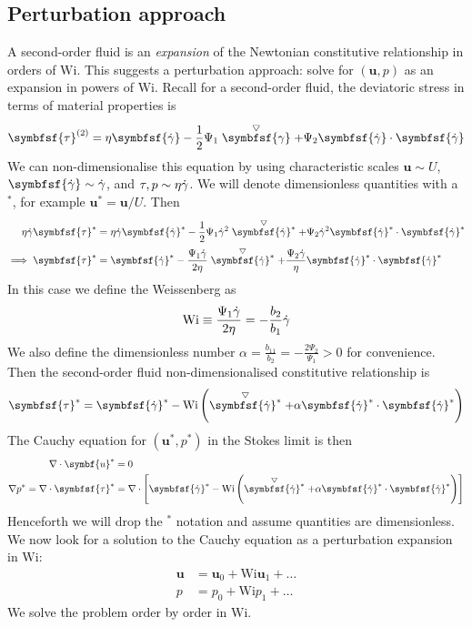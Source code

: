\documentclass{jknotes}
\newcommand{\ucd}[1]{\stackrel{\bigtriangledown}{#1}}
\begin{document}
\subsection{Perturbation approach}
A second-order fluid is an \emph{expansion} of the Newtonian constitutive
relationship in orders of $\text{Wi}$. This suggests a perturbation approach:
solve for $(\symbf{u}, p)$ as an expansion in powers of $\text{Wi}$.  Recall
for a second-order fluid, the deviatoric stress in terms of material
properties is
\begin{equation}
	\symbfsf{\tau}^{(2)} = \eta \symbfsf{\srate} - \frac{1}{2} \Psi_1
	\stackrel{\bigtriangledown}{\symbfsf{\gamma}} + \Psi_2
	\symbfsf{\srate}\cdot\symbfsf{\srate}
\end{equation}
We can non-dimensionalise this equation by using characteristic scales
$\symbf{u} \sim U$, $\symbfsf{\srate} \sim \srate$, and $\tau, p \sim \eta
\dot{\gamma}$. We will denote dimensionless quantities with a $^*$, for example
$\symbf{u}^* = \symbf{u}/U$. Then
\begin{align}
	\eta \srate \symbfsf{\tau}^* &= \eta \srate \symbfsf{\srate}^* -
	\frac{1}{2}\Psi_1 \srate^2 \ucd{\symbfsf{\srate}^*} + \Psi_2 \srate^2
	\symbfsf{\srate}^*\cdot\symbfsf{\srate}^*\\
	\implies \symbfsf{\tau}^* &= \symbfsf{\srate}^* -
	\frac{\Psi_1\srate}{2\eta} \ucd{\symbfsf{\srate}^*} +
	\frac{\Psi_2\srate}{\eta} \symbfsf{\srate}^*\cdot\symbfsf{\srate}^*
\end{align}
In this case we define the Weissenberg as
\begin{equation}
	\text{Wi} \equiv \frac{\Psi_1 \dot{\gamma}}{2\eta} = -\frac{b_2}{b_1} \dot{\gamma}
\end{equation}
We also define the dimensionless number $\alpha = \frac{b_{11}}{b_2} =
-\frac{2\Psi_2}{\Psi_1} > 0$ for convenience. Then the second-order fluid
non-dimensionalised constitutive relationship is
\begin{equation}
	\symbfsf{\tau}^* = \symbfsf{\srate}^* - \text{Wi}\left(
		\ucd{\symbfsf{\srate}^*} + \alpha
	\symbfsf{\srate}^*\cdot\symbfsf{\srate}^*\right)
\end{equation}
The Cauchy equation for $(\symbf{u}^*,p^*)$ in the Stokes limit is then
\begin{align}
	\nabla \cdot \symbf{u}^* &= 0 \\
	\nabla p^* = \nabla \cdot \symbfsf{\tau}^* &= \nabla \cdot
	\left[\symbfsf{\srate}^* - \text{Wi}\left(\ucd{\symbfsf{\srate}^*} +
	\alpha \symbfsf{\srate}^*\cdot\symbfsf{\srate}^*\right)\right]
\end{align}
Henceforth we will drop the $^*$ notation and assume quantities are
dimensionless. We now look for a solution to the Cauchy equation as a
perturbation expansion in $\text{Wi}$:
\begin{align}
	\symbf{u} &= \symbf{u}_0 + \text{Wi}\symbf{u}_1 + \dots \\
	p &= p_0 + \text{Wi}p_1 + \dots
\end{align}
We solve the problem order by order in $\text{Wi}$.
\end{document}
